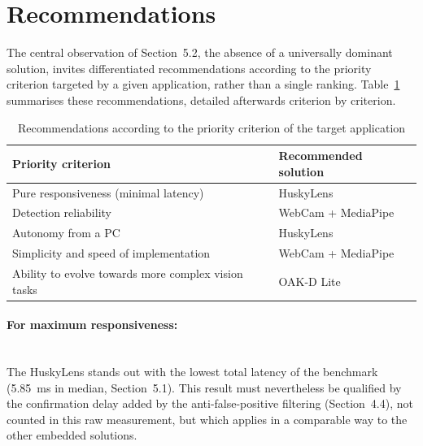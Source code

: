 \documentclass[12pt,a4paper]{report}
\begin{document}
	\newpage
	
	
	\section{Recommendations}
	
	The central observation of Section~5.2, the absence of a universally dominant solution, invites differentiated recommendations according to the priority criterion targeted by a given application, rather than a single ranking. Table~\ref{tab:recommandations} summarises these recommendations, detailed afterwards criterion by criterion.
	
	\begin{table}[H]
		\centering
		\small
		\renewcommand{\arraystretch}{1.3}
		\begin{tabularx}{\textwidth}{|l|X|}
			\hline
			\textbf{Priority criterion} & \textbf{Recommended solution} \\
			\hline
			Pure responsiveness (minimal latency) & HuskyLens \\
			\hline
			Detection reliability & WebCam + MediaPipe \\
			\hline
			Autonomy from a PC & HuskyLens \\
			\hline
			Simplicity and speed of implementation & WebCam + MediaPipe \\
			\hline
			Ability to evolve towards more complex vision tasks & OAK-D Lite \\
			\hline
		\end{tabularx}
		\caption{Recommendations according to the priority criterion of the target application}
		\label{tab:recommandations}
	\end{table}
	
	\paragraph{For maximum responsiveness:} \mbox{} \\  
	The HuskyLens stands out with the lowest total latency of the benchmark (5.85~ms in median, Section~5.1). This result must nevertheless be qualified by the confirmation delay added by the anti-false-positive filtering (Section~4.4), not counted in this raw measurement, but which applies in a comparable way to the other embedded solutions.
	
\end{document}
